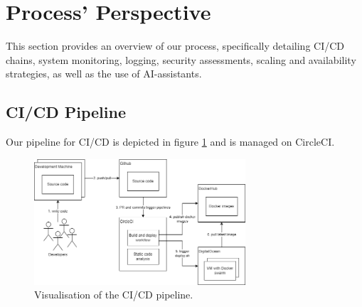 \section{Process' Perspective}



This section provides an overview of our process, specifically detailing CI/CD chains, system monitoring, logging, security assessments, scaling and availability strategies, as well as the use of AI-assistants. %


\subsection{CI/CD Pipeline}

Our pipeline for CI/CD is depicted in figure \ref{fig:cicd} and is managed on CircleCI. 

\begin{figure}[H]
    \centering
    \includegraphics[width=0.7\textwidth]{images/cicd.png}
    \caption{Visualisation of the CI/CD pipeline.}
    \label{fig:cicd}
\end{figure}


